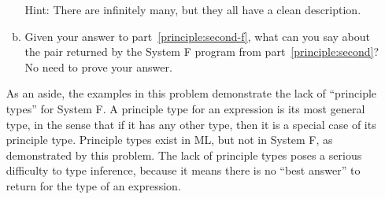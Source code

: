\documentclass{article}
\theoremstyle{definition}
\begin{document}
\begin{enumerate}[start=1,label={{\bf Problem \arabic*}.},ref=\arabic*,left=0pt..0pt,widest*=10,align=left,itemindent=*]
\begin{enumerate}[(a),left=1em]
    Hint: There are infinitely many, but they all have a clean description.
  \item Given your answer to part~\ref{principle:second-f}, what can you say
    about the pair returned by the System F program from part~\ref{principle:second}?
    No need to prove your answer.
  \end{enumerate}
  As an aside, the examples in this problem demonstrate the lack of ``principle
  types'' for System F. A principle type for an expression is its most general
  type, in the sense that if it has any other type, then it is a special case of
  its principle type. Principle types exist in ML, but not in System F, as
  demonstrated by this problem. The lack of principle types poses a serious
  difficulty to type inference, because it means there is no ``best answer'' to
  return for the type of an expression.


\end{enumerate}
\end{document}
